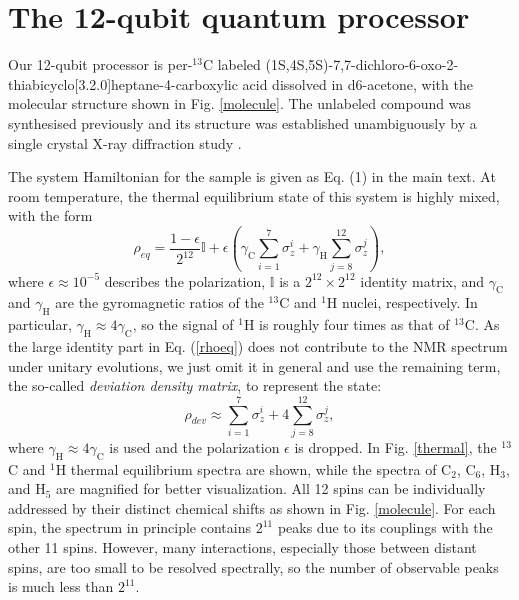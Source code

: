 \documentclass[twocolumn,reprint, amsmath,amssymb,showpacs,superscriptaddress]{revtex4-1}
\begin{document}
\section{The 12-qubit quantum processor}
Our 12-qubit processor is per-$^{13}$C labeled (1S,4S,5S)-7,7-dichloro-6-oxo-2-thiabicyclo[3.2.0]heptane-4-carboxylic acid dissolved in d6-acetone, with the molecular structure shown in Fig. \ref{molecule}.  The unlabeled compound was synthesised previously and its structure was established unambiguously by a single crystal X-ray diffraction study \cite{johnson2008cyclobutanone}.

The system Hamiltonian for the sample is given as  Eq. (1) in the main text. At room temperature, the thermal equilibrium state of this system is highly mixed, with the form
\begin{equation}
\rho_{eq}=\frac{1-\epsilon}{2^{12}} \mathbb{I} + \epsilon \left(\gamma_{\text{C}} \sum_{i=1}^7 \sigma_{z}^{i}+\gamma_{\text{H}} \sum_{j=8}^{12} \sigma_{z}^{j} \right),
\label{rhoeq}
\end{equation}
where $\epsilon \approx 10^{-5}$ describes the polarization, $ \mathbb{I}$ is a $2^{12} \times 2^{12}$ identity matrix, and $\gamma_{\text{C}}$ and $\gamma_{\text{H}}$ are the gyromagnetic ratios of the $^{13}$C and $^1$H nuclei, respectively. In particular, $\gamma_{\text{H}} \approx 4 \gamma_{\text{C}}$, so the signal of $^1$H is roughly four times as that of $^{13}$C. As the large identity part in Eq. (\ref{rhoeq}) does not contribute to the NMR spectrum under unitary evolutions, we just omit it in general and use the remaining term, the so-called \emph{deviation density matrix}, to represent the state:
\begin{equation}
\rho_{dev} \approx \sum_{i=1}^7 \sigma_{z}^{i}+ 4 \sum_{j=8}^{12} \sigma_{z}^{j},
\label{rhodev}
\end{equation}
where $\gamma_{\text{H}} \approx 4 \gamma_{\text{C}}$ is used and the polarization $\epsilon$ is dropped. In Fig. \ref{thermal}, the $^{13}$C and $^1$H thermal equilibrium spectra are shown, while the spectra of C$_2$, C$_6$, H$_3$, and H$_5$ are magnified for better visualization. All 12 spins can be individually addressed by their distinct chemical shifts as shown in Fig. \ref{molecule}. For each spin, the spectrum in principle contains $2^{11}$ peaks due to its couplings with the other 11 spins. However, many interactions, especially those between distant spins, are too small to be resolved spectrally, so the number of observable peaks is much less    than $2^{11}$.
\end{document}
